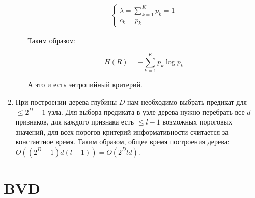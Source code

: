 \documentclass{article}
\begin{document}
\begin{enumerate}
\begin{enumerate}
        \begin{align*}
            \begin{cases}
                \lambda = \sum_{k=1}^{K} p_k = 1 \\
                c_k = p_k
            \end{cases}
        \end{align*}
        \normalsize
        
        Таким образом:
        
        \begin{equation*}
            H(R) = - \sum_{k=1}^K p_k \log{p_k}
        \end{equation*}
        
        А это и есть энтропийный критерий.
    \end{enumerate}
    
    \item При построении дерева глубины $ D $ нам необходимо выбрать предикат для $ \le 2^D - 1 $ узла. Для выбора предиката в узле дерева нужно
    перебрать все $ d $ признаков, для каждого признака есть $ \le l - 1 $ возможных пороговых значений, для всех порогов критерий информативности
    считается за константное время. Таким образом, общее время построения дерева: $ O((2^D - 1)d(l - 1)) = O(2^Dld) $.
\end{enumerate}

\section{BVD}
\end{document}
